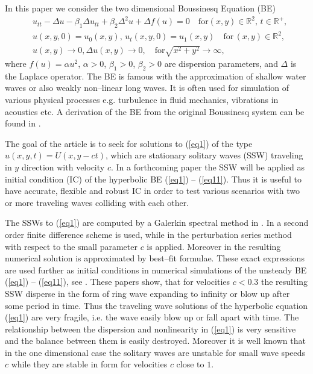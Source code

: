 \documentclass[leqno,11pt]{book}
\newcommand{\rf}[1]{(\ref{#1})}
\newcommand{\RR}{\mathbb{R}}
\begin{document}
In this paper we  consider the two dimensional Boussinesq  Equation (BE)
\begin{align}
&u_{tt} - \Delta u -\beta_1  \Delta u_{tt} +\beta_2 \Delta ^2 u + \Delta f(u)=0   \quad \text{for}  (x,y) \in \RR^2, \, t\in\RR^+,\label{eq1}
\\ \nonumber &u(x,y,0)=u_0(x,y), \, u_t(x,y,0)=u_1(x,y)   \quad\text{for} \, (x,y) \in \RR^2,
\\  &u(x,y) \rightarrow 0,  \Delta u(x,y) \rightarrow 0 ,  \quad \text{for}  \sqrt{x^2 + y^2} \rightarrow \infty, \label{eq11}
\end{align}
where   $f(u)=\alpha u^2$,  $\alpha>0$, $\beta_1>0$, $\beta_2>0$  are dispersion parameters, and $\Delta$ is the Laplace operator. The BE is famous with the approximation of shallow water waves or also weakly non--linear long waves. It is often used for simulation of various physical processes e.g. turbulence in fluid mechanics, vibrations in acoustics etc. A derivation of the BE from the original Boussinesq system can be found in \cite{ChChr}.

The goal of the article is to seek for solutions to (\ref{eq1}) of the type $u(x,y,t)=U(x,y-ct)$, which 
are stationary solitary waves (SSW) traveling  in $y$ direction with velocity $c$. In a forthcoming paper the SSW will be applied as initial condition (IC) of the hyperbolic BE \rf{eq1} -- \rf{eq11}. Thus it is useful to have accurate, flexible 
and robust IC in order to test various scenarios with two or more traveling waves colliding with each other.

The SSWs to \rf{eq1} are computed by a Galerkin spectral method in \cite{chr-chr-07,chr-chr}.
In \cite{Ch2012} a second order  finite difference scheme is used, while in \cite{Ch2011} 
the perturbation series method with respect to the small parameter $c$ is applied.  Moreover in \cite{Ch2011} 
the resulting numerical solution is approximated by best--fit formulae. These exact expressions are used further as initial conditions in 
numerical simulations of the unsteady BE \rf{eq1} -- \rf{eq11}, see  \cite{cher,dani}. These papers show, 
that for velocities $c<0.3$ the resulting SSW disperse in the form of ring wave expanding to infinity or blow up after some period in time. 
Thus the traveling wave solutions of the hyperbolic equation  \rf{eq1} are very fragile, i.e. the wave easily blow up or fall apart with time. 
The relationship between the dispersion and nonlinearity in \rf{eq1} is very sensitive  and the balance between them is easily destroyed.
Moreover it is well known  that in the one dimensional case the solitary waves are unstable  
for small wave speeds $c$ while they are stable in form for  velocities $c$ close to $1$. 
\end{document}
